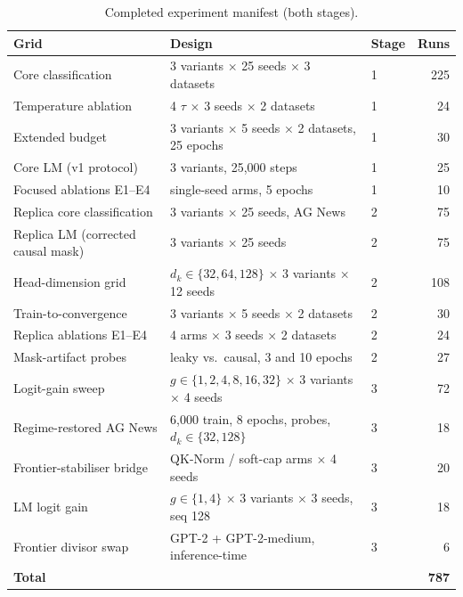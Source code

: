 \documentclass[10pt,a4paper]{article}
\newcommand{\dk}{d_k}
\begin{document}
\begin{table}[H]
  \centering
  \caption{Completed experiment manifest (both stages).}
  \label{tab:s4-manifest}
  \small
  \begin{tabular*}{\textwidth}{@{\extracolsep{\fill}} l l l r}
    \toprule
    \textbf{Grid} & \textbf{Design} & \textbf{Stage} & \textbf{Runs} \\
    \midrule
    Core classification & 3 variants $\times$ 25 seeds $\times$ 3 datasets & 1 & 225 \\
    Temperature ablation & 4 $\tau$ $\times$ 3 seeds $\times$ 2 datasets & 1 & 24 \\
    Extended budget & 3 variants $\times$ 5 seeds $\times$ 2 datasets, 25 epochs & 1 & 30 \\
    Core LM (v1 protocol) & 3 variants, 25{,}000 steps & 1 & 25 \\
    Focused ablations E1--E4 & single-seed arms, 5 epochs & 1 & 10 \\
    \midrule
    Replica core classification & 3 variants $\times$ 25 seeds, AG News & 2 & 75 \\
    Replica LM (corrected causal mask) & 3 variants $\times$ 25 seeds & 2 & 75 \\
    Head-dimension grid & $\dk \in \{32,64,128\}$ $\times$ 3 variants $\times$ 12 seeds & 2 & 108 \\
    Train-to-convergence & 3 variants $\times$ 5 seeds $\times$ 2 datasets & 2 & 30 \\
    Replica ablations E1--E4 & 4 arms $\times$ 3 seeds $\times$ 2 datasets & 2 & 24 \\
    Mask-artifact probes & leaky vs.\ causal, 3 and 10 epochs & 2 & 27 \\
    \midrule
    Logit-gain sweep & $g \in \{1,2,4,8,16,32\}$ $\times$ 3 variants $\times$ 4 seeds & 3 & 72 \\
    Regime-restored AG News & 6{,}000 train, 8 epochs, probes, $\dk \in \{32,128\}$ & 3 & 18 \\
    Frontier-stabiliser bridge & QK-Norm / soft-cap arms $\times$ 4 seeds & 3 & 20 \\
    LM logit gain & $g \in \{1,4\}$ $\times$ 3 variants $\times$ 3 seeds, seq 128 & 3 & 18 \\
    Frontier divisor swap & GPT-2 + GPT-2-medium, inference-time & 3 & 6 \\
    \midrule
    \textbf{Total} & & & \textbf{787} \\
    \bottomrule
  \end{tabular*}
\end{table}
\end{document}
